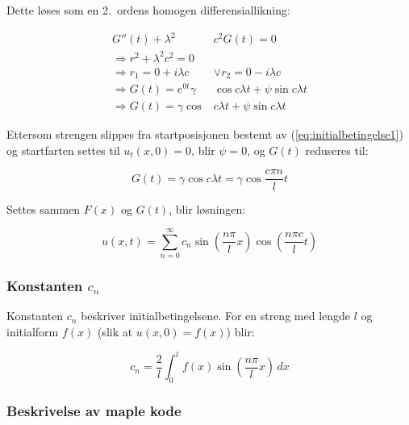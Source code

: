 Dette løses som en 2.\ ordens homogen differensiallikning:

\begin{align*}
	G''(t) + \lambda^2 & c^2 G(t) = 0 \\
	\Rightarrow r^2 + \lambda^2 c^2 = 0 \\
	\Rightarrow r_1 = 0 + i \lambda c &\vee r_2 = 0 - i \lambda c \\ 
	\Rightarrow G(t) = e^{0 t} \gamma&\cos c \lambda t + \psi \sin c \lambda t \\
	\Rightarrow G(t) = \gamma\cos & c \lambda t + \psi \sin c \lambda t
\end{align*}

Ettersom strengen slippes fra startposisjonen bestemt av (\ref{eq:initialbetingelse1}) og startfarten settes til $u_t(x,0)=0$,
blir $\psi=0$, og $G(t)$ reduseres til:

\begin{equation*}
	G(t) = \gamma \cos c \lambda t = \gamma \cos \frac{c \pi n}{l} t
\end{equation*}

Settes sammen $F(x)$ og $G(t)$, blir løsningen:

\begin{equation}
	u(x,t) = \sum_{n=0}^{\infty} c_n 
	\sin \left( \frac{n \pi}{l} x \right)
	\cos \left( \frac{n \pi c}{l} t \right)
	\label{eq:bølgelikningLøst}	
\end{equation}

\subsubsection{Konstanten \texorpdfstring{$c_n$}{cn}}

Konstanten $c_n$ beskriver initialbetingelsene. For en streng med lengde
$l$ og initialform $f(x)$ (slik at $u(x,0)=f(x)$) blir:

\begin{equation}
	c_n = \frac{2}{l} \int_{0}^{l} f(x) \sin \left( \frac{n \pi}{l} x \right) \,dx
	\label{eq:cnDefinisjon}
\end{equation}

\subsubsection{Beskrivelse av maple kode}

